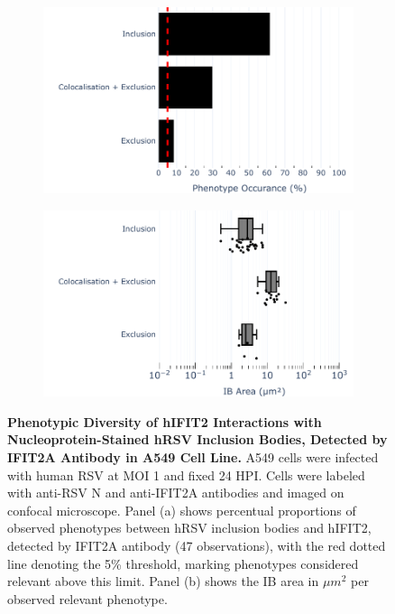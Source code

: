 \begin{figure}
    \begin{subfigure}{0.495\textwidth}
        \caption{}
        \includegraphics[width=1\linewidth]{08. Chapter 3/Figs/02. Infection/02. IFIT2/01. IFIT2A/01. bar_i2a_a549-n.pdf}
    \end{subfigure}
    \begin{subfigure}{0.495\textwidth}
        \caption{}
        \includegraphics[width=1\linewidth]{08. Chapter 3/Figs/02. Infection/02. IFIT2/01. IFIT2A/02. box_i2a_a549-n.pdf}
    \end{subfigure}
    \caption[Phenotypic Diversity of hIFIT2 Interactions with Nucleoprotein-Stained hRSV Inclusion Bodies, Detected by IFIT2A Antibody in A549 Cell Line.]{\textbf{Phenotypic Diversity of hIFIT2 Interactions with Nucleoprotein-Stained hRSV Inclusion Bodies, Detected by IFIT2A Antibody in A549 Cell Line.} A549 cells were infected with human RSV at MOI 1 and fixed 24 HPI. Cells were labeled with anti-RSV N and anti-IFIT2A antibodies and imaged on confocal microscope. Panel (a) shows percentual proportions of observed phenotypes between hRSV inclusion bodies and hIFIT2, detected by IFIT2A antibody (47 observations), with the red dotted line denoting the 5\% threshold, marking phenotypes considered relevant above this limit. Panel (b) shows the IB area in \(\mu m^2\) per observed relevant phenotype.}
    \label{fig:Phenotypic Diversity of hIFIT2 Interactions with Nucleoprotein-Stained hRSV Inclusion Bodies, Detected by IFIT2A Antibody in A549 Cell Line}
\end{figure}

